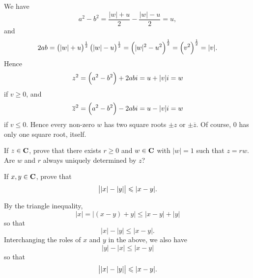 \begin{solution}
We have
\[a^2-b^2=\frac{|w|+u}{2}-\frac{|w|-u}{2}=u,\]
and
\[2ab=\left(|w|+u\right)^\frac{1}{2}\left(|w|-u\right)^\frac{1}{2}=\left(|w|^2-u^2\right)^\frac{1}{2}=\left(v^2\right)^\frac{1}{2}=|v|.\]
Hence
\[z^2=\left(a^2-b^2\right)+2abi=u+|v|i=w\]
if $v\ge0$, and
\[\overline{z}^2=\left(a^2-b^2\right)-2abi=u-|v|i=w\]
if $v\le0$. Hence every non-zero $w$ has two square roots $\pm z$ or $\pm\overline{z}$. Of course, $0$ has only one square root, itself.
\end{solution}

\begin{prbm}
If $z\in\mathbf C$, prove that there exists $r\ge0$ and $w\in\mathbf C$ with $|w|=1$ such that $z=rw$. Are $w$ and $r$ always uniquely determined by $z$?
\end{prbm}

\begin{prbm}
If $x,y\in\mathbf C$, prove that
\[\left||x|-|y|\right|\leqslant|x-y|.\]
\end{prbm}

\begin{solution}
By the triangle inequality,
\[|x|=|(x-y)+y|\le|x-y|+|y|\]
so that
\[|x|-|y|\le|x-y|.\]
Interchanging the roles of $x$ and $y$ in the above, we also have
\[|y|-|x|\le|x-y|\]
so that
\[\left||x|-|y|\right|\leqslant|x-y|.\]
\end{solution}